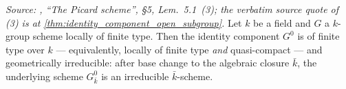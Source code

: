 \begin{theorem}\leanok
  \label{thm:identity_component_finite_type_geom_irreducible}

  \textit{Source: \cite{kleiman-picard}, ``The Picard scheme'', \S 5,
  Lem.~5.1~(3); the verbatim source quote of (3) is at
  \cref{thm:identity_component_open_subgroup}.}
  Let \(k\) be a field and \(G\) a \(k\)-group scheme locally of finite
  type. Then the identity component \(G^0\) is of finite type over
  \(k\) --- equivalently, locally of finite type \emph{and}
  quasi-compact --- and geometrically irreducible: after base change
  to the algebraic closure \(\bar k\), the underlying scheme
  \(G^0_{\bar k}\) is an irreducible \(\bar k\)-scheme.
\end{theorem}

